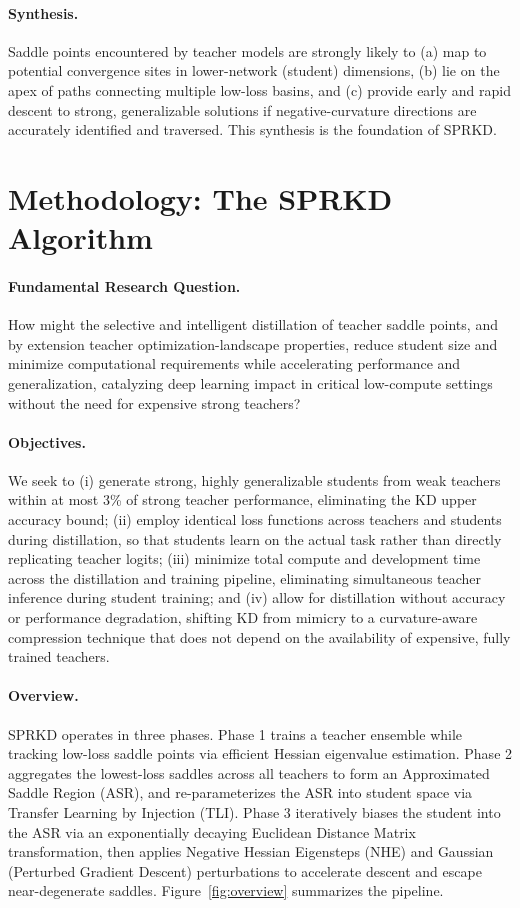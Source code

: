 \documentclass[letterpaper]{article}
\begin{document}
\paragraph{Synthesis.}
Saddle points encountered by teacher models are strongly likely to (a) map to potential convergence sites in lower-network (student) dimensions, (b) lie on the apex of paths connecting multiple low-loss basins, and (c) provide early and rapid descent to strong, generalizable solutions if negative-curvature directions are accurately identified and traversed. This synthesis is the foundation of SPRKD.

\section{Methodology: The SPRKD Algorithm}
\label{sec:method}

\paragraph{Fundamental Research Question.}
How might the selective and intelligent distillation of teacher saddle points, and by extension teacher optimization-landscape properties, reduce student size and minimize computational requirements while accelerating performance and generalization, catalyzing deep learning impact in critical low-compute settings without the need for expensive strong teachers?

\paragraph{Objectives.}
We seek to (i) generate strong, highly generalizable students from weak teachers within at most 3\% of strong teacher performance, eliminating the KD upper accuracy bound; (ii) employ identical loss functions across teachers and students during distillation, so that students learn on the actual task rather than directly replicating teacher logits; (iii) minimize total compute and development time across the distillation and training pipeline, eliminating simultaneous teacher inference during student training; and (iv) allow for distillation without accuracy or performance degradation, shifting KD from mimicry to a curvature-aware compression technique that does not depend on the availability of expensive, fully trained teachers.

\paragraph{Overview.}
SPRKD operates in three phases. Phase 1 trains a teacher ensemble while tracking low-loss saddle points via efficient Hessian eigenvalue estimation. Phase 2 aggregates the lowest-loss saddles across all teachers to form an Approximated Saddle Region (ASR), and re-parameterizes the ASR into student space via Transfer Learning by Injection (TLI). Phase 3 iteratively biases the student into the ASR via an exponentially decaying Euclidean Distance Matrix transformation, then applies Negative Hessian Eigensteps (NHE) and Gaussian (Perturbed Gradient Descent) perturbations to accelerate descent and escape near-degenerate saddles. Figure~\ref{fig:overview} summarizes the pipeline.
\end{document}
